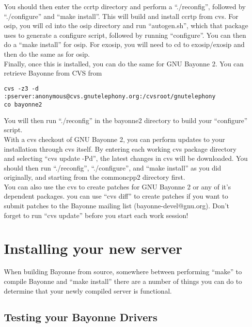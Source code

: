 \documentclass[a4paper,12pt]{article}
\begin{document}
You should then enter the ccrtp directory and perform a ``./reconfig'',
followed by ``./configure'' and ``make install''.  This will build and
install ccrtp from cvs.  For osip, you will cd into the osip directory
and run ``autogen.sh'', which that package uses to generate a configure
script, followed by running ``configure''.  You can then do a ``make
install'' for osip.  For exosip, you will need to cd to exosip/exosip
and then do the same as for osip. \\

Finally, once this is installed, you can do the
same for GNU Bayonne 2.  You can retrieve Bayonne from CVS from \\

\begin{verbatim}
cvs -z3 -d :pserver:anonymous@cvs.gnutelephony.org:/cvsroot/gnutelephony 
co bayonne2
\end{verbatim}

You will then run ``./reconfig'' in the bayonne2 directory to build your
``configure'' script. \\

With a cvs checkout of GNU Bayonne 2, you can perform updates to your
installation through cvs itself.  By entering each working cvs package
directory and selecting ``cvs update -Pd'', the latest changes in cvs will
be downloaded.  You should then run ``./reconfig'', ``./configure'', and
``make install'' as you did originally, and starting from the commoncpp2
directory first. \\

You can also use the cvs to create patches for GNU Bayonne 2 or any of
it's dependent packages.  you can use ``cvs diff'' to create patches if
you want to submit patches to the Bayonne mailing list
(bayonne-devel@gnu.org). Don't forget to run ``cvs update'' before you
start each work session! \\

\section{Installing your new server}

When building Bayonne from source, somewhere between performing ``make''
to compile Bayonne and ``make install'' there are a number of things you
can do to determine that your newly compiled server is functional. \\

\subsection{Testing your Bayonne Drivers}
\end{document}
